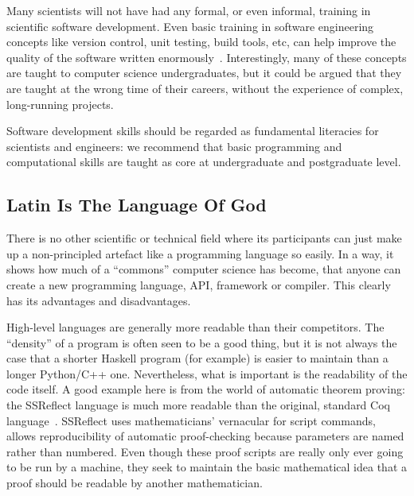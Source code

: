\documentclass[a4paper,11pt]{article}
\begin{document}
Many scientists will not have had any formal, or even informal,
training in scientific software development. Even basic training in software engineering
concepts like version control, unit testing, build tools, etc, can help improve the
quality of the software written enormously~\cite{wilson2006}.
Interestingly, many of these concepts are taught to computer science
undergraduates, but it could be argued that they are taught at the
wrong time of their careers, without the experience of complex,
long-running projects.

 Software
development skills should be regarded as fundamental literacies for
scientists and engineers: we recommend that basic programming and
computational skills are taught as core at undergraduate and
postgraduate level.

\subsection{Latin Is The Language Of God} 

There is no other scientific or technical field where its participants
can just make up a non-principled artefact like a programming language
so easily. In a way, it shows how much of a ``commons'' computer
science has become, that anyone can create a new programming language,
API, framework or compiler. This clearly has its advantages and
disadvantages.

High-level languages are generally more readable than their
competitors. The ``density'' of a program is often seen to be a good
thing, but it is not always the case that a shorter Haskell program
(for example) is easier to maintain than a longer Python/C++
one. Nevertheless, what is important is the readability of the code
itself. A good example here is from the world of automatic theorem
proving: the SSReflect language is much more readable than the
original, standard Coq language~\cite{GonthierZND13}. SSReflect uses
mathematicians' vernacular for script commands, allows reproducibility
of automatic proof-checking because parameters are named rather than
numbered.  Even though these proof scripts are really only ever going
to be run by a machine, they seek to maintain the basic mathematical
idea that a proof should be readable by another mathematician.
\end{document}
